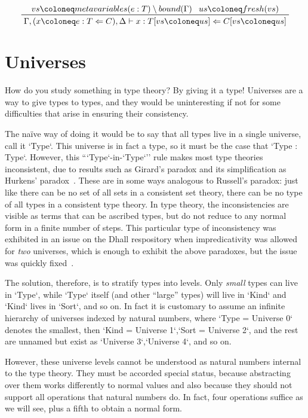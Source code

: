 \documentclass[11pt, twoside, reqno]{book}
\begin{document}
\begin{displaymath}
\prftree{vs \coloneq metavariables(e : T) \setminus bound(\Gamma)}{us \coloneq fresh(vs)}{\Gamma, (x \coloneq e : T \Leftarrow C), \Delta \vdash x : T[vs \coloneq us] \Leftarrow C[vs \coloneq us]}
\end{displaymath}


\chapter{Universes}
\label{universes}


How do you study something in type theory?
By giving it a type!
Universes are a way to give types to types, and they would be uninteresting if not for some difficulties that arise in ensuring their consistency.

The na\"ive way of doing it would be to say that all types live in a single universe, call it \inHS`Type`.
This universe is in fact a type, so it must be the case that \inHS`Type : Type`.
However, this ``\inHS`Type`-in-\inHS`Type`'' rule makes most type theories inconsistent, due to results such as Girard's paradox and its simplification as Hurkens' paradox~\cite{10.5555/645892.671442}.
These are in some ways analogous to Russell's paradox: just like there can be no set of all sets in a consistent set theory, there can be no type of all types in a consistent type theory.
In type theory, the inconsistencies are visible as terms that can be ascribed types, but do not reduce to any normal form in a finite number of steps.
This particular type of inconsistency was exhibited in an issue on the Dhall respository when impredicativity was allowed for \emph{two} universes, which is enough to exhibit the above paradoxes, but the issue was quickly fixed~\cite{ferrai_2018}.

The solution, therefore, is to stratify types into levels.
Only \emph{small} types can live in \inHS`Type`, while \inHS`Type` itself (and other ``large'' types) will live in \inHS`Kind` and \inHS`Kind` lives in \inHS`Sort`, and so on.
In fact it is customary to assume an infinite hierarchy of universes indexed by natural numbers, where \inHS`Type = Universe 0` denotes the smallest, then \inHS`Kind = Universe 1`,\enskip\inHS`Sort = Universe 2`, and the rest are unnamed but exist as \inHS`Universe 3`,\enskip\inHS`Universe 4`, and so on.

However, these universe levels cannot be understood as natural numbers internal to the type theory.
They must be accorded special status, because abstracting over them works differently to normal values and also because they should not support all operations that natural numbers do.
In fact, four operations suffice as we will see, plus a fifth to obtain a normal form.
\end{document}
